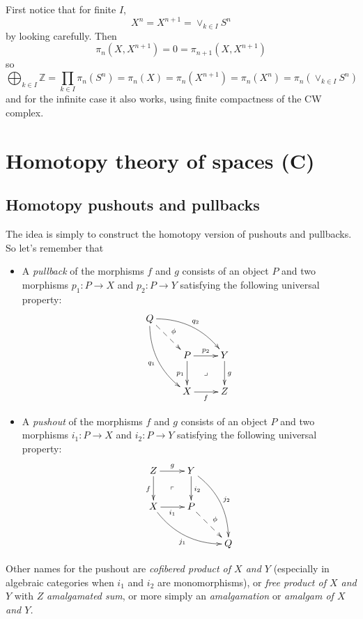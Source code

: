 \begin{proposition}
\label{proposition-finite-i}
First notice that for finite $I$,
$$X^n=X^{n+1}=\vee_{k\in I}S^n$$
by looking carefully. Then
$$\pi_n(X,X^{n+1})=0=\pi_{n+1}(X,X^{n+1})$$
so
$$
\bigoplus_{k\in I}\mathbb{Z}
=\prod_{k\in I}\pi_n(S^n)
=\pi_n(X)=\pi_n(X^{n+1})
=\pi_n(X^n)=\pi_n\left(
\vee_{k\in I}S^n\right)
$$
and for the infinite case it also works,
using finite compactness of the CW complex.
\end{proposition}

\section{Homotopy theory of spaces (C)}
\label{section-homotopy-theory-of-spaces-c}

\subsection{Homotopy pushouts and pullbacks}
\label{subsection-homot-pusho-pullb}
The idea is simply to construct the homotopy
version of pushouts and pullbacks. So let's
remember that
\begin{definition}
\label{definition-item-2}
	\begin{itemize}
		\item A {\it pullback} of the morphisms $f$
		and $g$ consists of an object $P$ and two
		morphisms $p_1:P\to X$ and $p_2:P\to Y$
		satisfying the following universal
		property:
		$$
		\xymatrix{
			Q\ar@/^1pc/[rrd]^{q_2}\ar@/_1pc/[ddr]
			_{q_1}
			\ar@{-->}[dr]^{\phi}\\
			&P\ar[r]^{p_2}\ar@{}[rd]|{\lrcorner}
			\ar[d]_{p_1}&Y\ar[d]^{g}\\
			&X\ar[r]_{f}&Z
		}
		$$
		\item A {\it pushout} of the morphisms $f$
		and $g$ consists of an object $P$ and two
		morphisms $i_1:P\to X$ and $i_2:P\to Y$
		satisfying the following universal
		property:
		$$
		\xymatrix{
			Z\ar[r]^{g}\ar[d]_{f}
			&Y\ar[d]^{i_2}\ar@/^1pc/[ddr]^{j_2}\\
			X\ar[r]_{i_1}\ar@/_1pc/[drr]_{j_1}
			&P\ar@{}[ul]|{\ulcorner}\ar@{-->}[dr]
			^{\phi}\\
			&&Q
		}
		$$
	\end{itemize}
\end{definition}
\begin{remark}
\label{remark-other-names-pusho-cofib-prod}
Other names for the pushout are {\it
cofibered product of $X$ and $Y$} (especially
in algebraic categories when $i_1$ and $i_2$
are monomorphisms), or {\it free product of
$X$ and $Y$} with $Z$ {\it amalgamated sum},
or more simply an {\it amalgamation} or {\it
amalgam of $X$ and $Y$.}
\end{remark}
